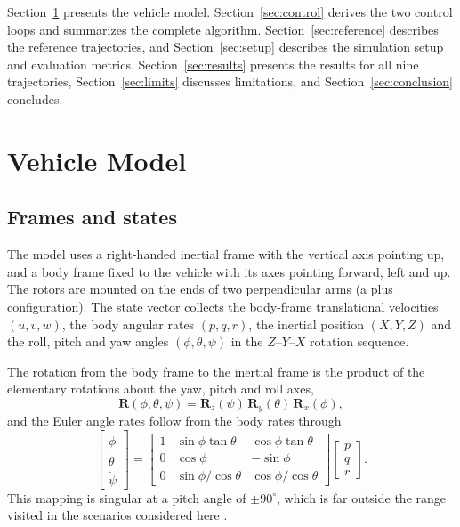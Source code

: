 \documentclass[11pt,a4paper]{article}
\numberwithin{equation}{section}
\newcommand{\vect}[1]{\mathbf{#1}}
\begin{document}
Section~\ref{sec:model} presents the vehicle model. Section~\ref{sec:control} derives the two control loops and summarizes the complete algorithm. Section~\ref{sec:reference} describes the reference trajectories, and Section~\ref{sec:setup} describes the simulation setup and evaluation metrics. Section~\ref{sec:results} presents the results for all nine trajectories, Section~\ref{sec:limits} discusses limitations, and Section~\ref{sec:conclusion} concludes.

\section{Vehicle Model}\label{sec:model}

\subsection{Frames and states}

The model uses a right-handed inertial frame with the vertical axis pointing up, and a body frame fixed to the vehicle with its axes pointing forward, left and up. The rotors are mounted on the ends of two perpendicular arms (a plus configuration). The state vector collects the body-frame translational velocities $(u,v,w)$, the body angular rates $(p,q,r)$, the inertial position $(X,Y,Z)$ and the roll, pitch and yaw angles $(\phi,\theta,\psi)$ in the $Z$--$Y$--$X$ rotation sequence.

The rotation from the body frame to the inertial frame is the product of the elementary rotations about the yaw, pitch and roll axes,
\begin{equation}
\vect{R}(\phi,\theta,\psi)=\vect{R}_z(\psi)\,\vect{R}_y(\theta)\,\vect{R}_x(\phi),
\end{equation}
and the Euler angle rates follow from the body rates through
\begin{equation}
\begin{bmatrix}\dot\phi\\ \dot\theta\\ \dot\psi\end{bmatrix}=
\begin{bmatrix}
1 & \sin\phi\tan\theta & \cos\phi\tan\theta\\
0 & \cos\phi & -\sin\phi\\
0 & \sin\phi/\cos\theta & \cos\phi/\cos\theta
\end{bmatrix}
\begin{bmatrix}p\\ q\\ r\end{bmatrix}.
\end{equation}
This mapping is singular at a pitch angle of $\pm 90^\circ$, which is far outside the range visited in the scenarios considered here \cite{craig2005}.
\end{document}
